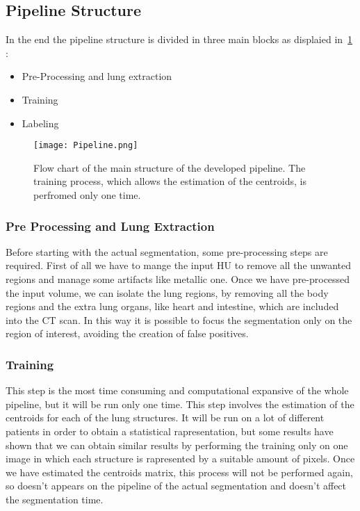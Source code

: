 \documentclass{standalone}
\begin{document}
	\subsection{Pipeline Structure}
	
	In the end the pipeline structure is divided in three main blocks as displaied in \figurename\,\ref{fig:Pipeline} : 
	\begin{itemize}
		\item Pre-Processing and lung extraction 
		\item Training 
		\item Labeling
	\end{itemize}
	
		
	\begin{figure}\label{fig:Pipeline}
		\centering 
		\texttt{[image: Pipeline.png]}
		\caption{Flow chart of the main structure of the developed pipeline. The training process, which allows the estimation of the centroids, is perfromed only one time.}
	\end{figure} 

	\subsubsection*{Pre Processing and Lung Extraction}
	
	Before starting with the actual segmentation, some pre-processing steps are required. First of all we have to mange the input HU to remove all the unwanted regions and manage some artifacts like metallic one. 
	Once we have pre-processed the input volume, we can isolate the lung regions, by removing all the body regions and the extra lung organs, like heart and intestine, which are included into the CT scan. 
	In this way it is possible to focus the segmentation only on the region of interest, avoiding the creation of false positives.   
	
	\subsubsection*{Training}
	
	This step is the most time consuming and computational expansive of the whole pipeline, but it will be run only one time. This step involves the estimation of the centroids for each of the lung structures. It will be run on a lot of different patients in order to obtain a statistical rapresentation, but some results have shown that we can obtain similar results by performing the training only on one image in which each structure is rapresented by a suitable amount of pixels. 
	Once we have estimated the centroids matrix, this process will not be performed again, so doesn't appears on the pipeline of the actual segmentation and doesn't affect the segmentation time. 
	
\end{document}
